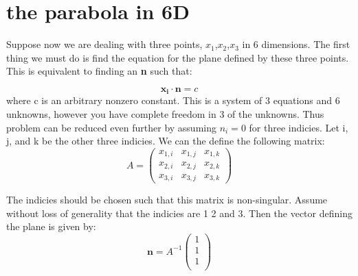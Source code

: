\documentclass{article}
\begin{document}
\section{the parabola in 6D}
Suppose now we are dealing with three points, \textbf{$x_1$},\textbf{$x_2$},\textbf{$x_3$} in 6 dimensions. The first thing we must do is find the equation for the plane defined by these three points. This is equivalent to finding an \textbf{n} such that:

\begin{equation}
\mathbf{x_i}\cdot\mathbf{n} = c
\end{equation}
where c is an arbitrary nonzero constant. This is a system of 3 equations and 6 unknowns, however you have complete freedom in 3 of the unknowns. Thus problem can be reduced even further by assuming $n_i = 0$ for three indicies. Let i, j, and k be the other three indicies. We can the define the following matrix:
\begin{equation}
A = \left( 
\begin{array}{ccc}
x_{1,i} & x_{1,j} & x_{1,k} \\
x_{2,i} & x_{2,j} & x_{2,k} \\
x_{3,i} & x_{3,j} & x_{3,k} 
\end{array}
\right)
\end{equation}

The indicies should be chosen such that this matrix is non-singular. Assume without loss of generality that the indicies are 1 2 and 3. Then the vector defining the plane is given by:
\begin{equation}
\mathbf{n} = A^{-1}\left(\begin{array}{c} 1 \\ 1\\ 1\\ \end{array}\right)
\end{equation}
\end{document}
